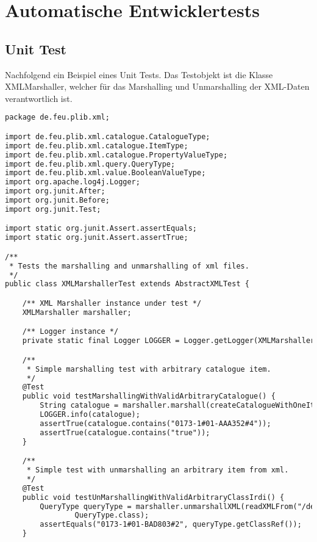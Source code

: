 \chapter{Automatische Entwicklertests} \label{anh:automatischeentwicklertests}
 
\section{Unit Test}
Nachfolgend ein Beispiel eines Unit Tests. Das Testobjekt ist die Klasse XMLMarshaller, welcher für das \gls{Marshalling} und \gls{Unmarshalling} der XML-Daten verantwortlich ist. 
 
\begin{lstlisting}[caption=Beispiel eines Unit Tests, language=XML, label=lst:unittest_beispiel]
package de.feu.plib.xml;

import de.feu.plib.xml.catalogue.CatalogueType;
import de.feu.plib.xml.catalogue.ItemType;
import de.feu.plib.xml.catalogue.PropertyValueType;
import de.feu.plib.xml.query.QueryType;
import de.feu.plib.xml.value.BooleanValueType;
import org.apache.log4j.Logger;
import org.junit.After;
import org.junit.Before;
import org.junit.Test;

import static org.junit.Assert.assertEquals;
import static org.junit.Assert.assertTrue;

/**
 * Tests the marshalling and unmarshalling of xml files.
 */
public class XMLMarshallerTest extends AbstractXMLTest {

    /** XML Marshaller instance under test */
    XMLMarshaller marshaller;

    /** Logger instance */
    private static final Logger LOGGER = Logger.getLogger(XMLMarshallerTest.class);

    /**
     * Simple marshalling test with arbitrary catalogue item.
     */
    @Test
    public void testMarshallingWithValidArbitraryCatalogue() {
        String catalogue = marshaller.marshall(createCatalogueWithOneItem());
        LOGGER.info(catalogue);
        assertTrue(catalogue.contains("0173-1#01-AAA352#4"));
        assertTrue(catalogue.contains("true"));
    }

    /**
     * Simple test with unmarshalling an arbitrary item from xml.
     */
    @Test
    public void testUnMarshallingWithValidArbitraryClassIrdi() {
        QueryType queryType = marshaller.unmarshallXML(readXMLFrom("/de/feu/plib/xml/query_class_irdi.xml"),
                QueryType.class);
        assertEquals("0173-1#01-BAD803#2", queryType.getClassRef());
    }


\end{lstlisting}
